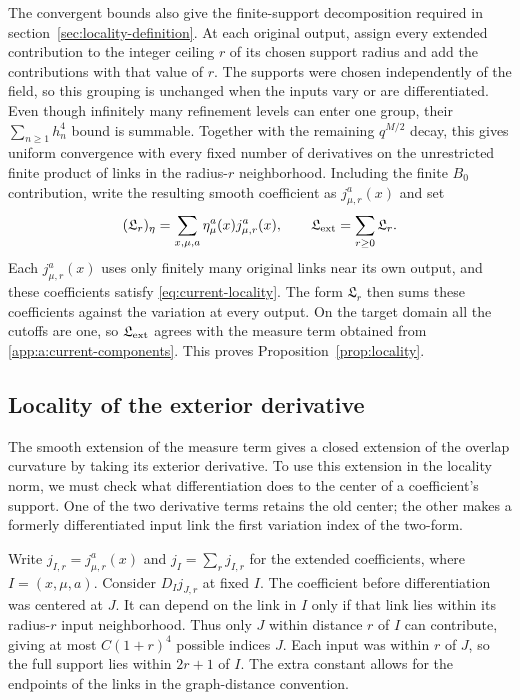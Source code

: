 \documentclass[11pt,a4paper]{article}
\theoremstyle{remark}
\begin{document}
The convergent bounds also give the finite-support decomposition required
in section~\ref{sec:locality-definition}. At each original output,
assign every extended contribution to the integer ceiling $r$ of its
chosen support radius and add the contributions with that value of $r$.
The supports were chosen independently of the field, so this grouping
is unchanged when the inputs vary or are differentiated. Even though
infinitely many refinement levels can enter one group, their
$\sum_{n\ge1}h_n^4$ bound is summable. Together with the remaining
$q^{M/2}$ decay, this gives uniform convergence with every fixed
number of derivatives on the unrestricted finite product of links in
the radius-$r$ neighborhood. Including the finite $B_0$ contribution,
write the resulting smooth coefficient as $j_{\mu,r}^a(x)$ and set
\begin{equation}
 (\mathfrak L_r)_\eta
    =\sum_{x,\mu,a}\eta_\mu^a(x)j_{\mu,r}^a(x),
 \qquad \mathfrak L_{\rm ext}=\sum_{r\ge0}\mathfrak L_r.
\end{equation}
Each $j_{\mu,r}^a(x)$ uses only finitely many original links near its
own output, and these coefficients satisfy \eqref{eq:current-locality}. The form
$\mathfrak L_r$ then sums these coefficients against the variation
at every output. On the target domain all the cutoffs are one, so
$\mathfrak L_{\rm ext}$ agrees with the measure term obtained from
\eqref{app:a:current-components}. This proves
Proposition~\ref{prop:locality}.

\subsection{Locality of the exterior derivative}

The smooth extension of the measure term gives a closed extension of
the overlap curvature by taking its exterior derivative. To use this
extension in the locality norm, we must check what differentiation does
to the center of a coefficient's support. One of the two derivative
terms retains the old center; the other makes a formerly differentiated
input link the first variation index of the two-form.

Write $j_{I,r}=j_{\mu,r}^a(x)$ and $j_I=\sum_rj_{I,r}$ for the
extended coefficients, where $I=(x,\mu,a)$. Consider $D_Ij_{J,r}$
at fixed $I$. The coefficient before differentiation was centered at
$J$. It can depend on the link in $I$ only if that link lies within
its radius-$r$ input neighborhood. Thus only $J$ within distance $r$
of $I$ can contribute, giving at most $C(1+r)^4$ possible indices
$J$. Each input was within $r$ of $J$, so the full support lies
within $2r+1$ of $I$. The extra constant allows for the endpoints
of the links in the graph-distance convention.
\end{document}
